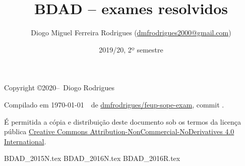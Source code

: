 \documentclass{bdad}
\title{BDAD -- exames resolvidos}
\author{Diogo Miguel Ferreira Rodrigues (\href{mailto:dmfrodrigues2000@gmail.com}{dmfrodrigues2000@gmail.com})}
\date{2019/20, 2º semestre}
\begin{document}
\maketitle
\begin{secondpage}
    Copyright \copyright 2020--\the\year\ Diogo Rodrigues\par
    \par
    \immediate{}
    Compilado em \today~\currenttime~de \href{https://github.com/dmfrodrigues/feup-sope-exam}{dmfrodrigues/feup-sope-exam}, commit \unskip.\par
    É permitida a cópia e distribuição deste documento sob os termos da licença pública
    \href{https://creativecommons.org/licenses/by-nc-nd/4.0/}{Creative Commons Attribution-NonCommercial-NoDerivatives 4.0 International}.
\end{secondpage}
\frontmatter
\tableofcontents
\mainmatter
{BDAD_2015N.tex}
{BDAD_2016N.tex}
{BDAD_2016R.tex}
\end{document}
